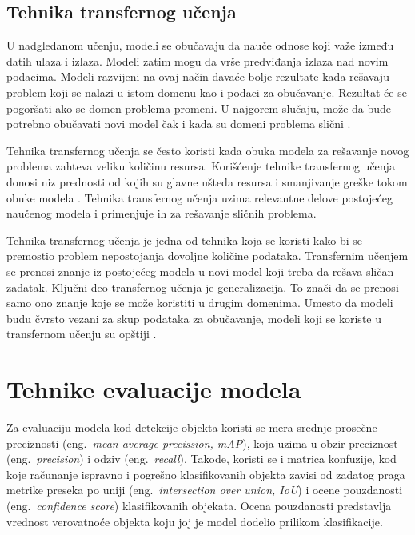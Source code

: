 \documentclass[12pt,oneside]{memoir}
\begin{document}
\section{Tehnika transfernog učenja}
\label{section3_trasnferucenje}

U nadgledanom učenju, modeli se obučavaju da nauče odnose koji važe između datih ulaza i izlaza. Modeli zatim mogu da vrše predviđanja izlaza nad novim podacima. Modeli razvijeni na ovaj način davaće bolje rezultate kada rešavaju problem koji se nalazi u istom domenu kao i podaci za obučavanje. Rezultat će se pogoršati ako se domen problema promeni. U najgorem slučaju, može da bude potrebno obučavati novi model čak i kada su domeni problema slični \cite{zhuang2020comprehensive}.

Tehnika transfernog učenja se često koristi kada obuka modela za rešavanje novog problema zahteva veliku količinu resursa. Korišćenje tehnike transfernog učenja donosi niz prednosti od kojih su glavne ušteda resursa i smanjivanje greške tokom obuke modela \cite{zhuang2020comprehensive}. Tehnika transfernog učenja uzima relevantne delove postojećeg naučenog modela i primenjuje ih za rešavanje sličnih problema. 

Tehnika transfernog učenja je jedna od tehnika koja se koristi kako bi se premostio problem nepostojanja dovoljne količine podataka. Transfernim učenjem se prenosi znanje iz postojećeg modela u novi model koji treba da rešava sličan zadatak. Ključni deo transfernog učenja je generalizacija. To znači da se prenosi samo ono znanje koje se može koristiti u drugim  domenima. Umesto da modeli budu čvrsto vezani za skup podataka za obučavanje, modeli koji se koriste u transfernom učenju su opštiji \cite{zhuang2020comprehensive}.




\chapter{Tehnike evaluacije modela}
\label{section4}

Za evaluaciju modela kod detekcije objekta koristi se mera srednje prosečne preciznosti (eng.~\textit{mean average precission, mAP}), koja uzima u obzir preciznost (eng.~\textit{precision}) i odziv (eng.~\textit{recall}). Takođe, koristi se i matrica konfuzije, kod koje računanje ispravno i pogrešno klasifikovanih objekta zavisi od zadatog praga metrike preseka po uniji (eng.~\textit{intersection over union, IoU}) i ocene pouzdanosti (eng.~\textit{confidence score}) klasifikovanih objekata. Ocena pouzdanosti predstavlja vrednost verovatnoće objekta koju joj je model dodelio prilikom klasifikacije.
\end{document}
